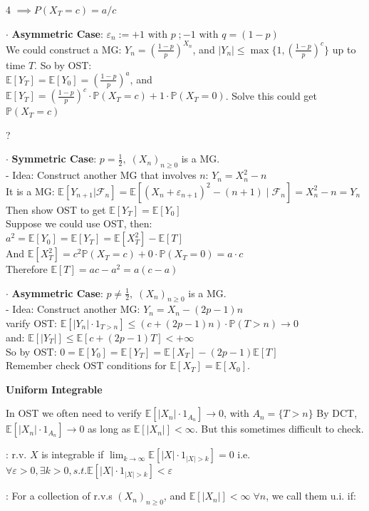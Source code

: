 \documentclass[a4paper, landscape]{article}
\newcommand{\topic}[1]{\par\medskip\textbf{#1}\par}
\newcommand{\subtopic}[1]{\par\textbf{#1}}
\renewcommand{\topic}[1]{\par\medskip\noindent\colorbox{highlightcolor}{\parbox{\dimexpr\columnwidth-2\fboxsep\relax}{\textbf{#1}}}\par}
\renewcommand{\subtopic}[1]{\par\textbf{\color{blue}{#1}}} %
\begin{document}
\begin{multicols}{4}
$\implies P(X_T=c)=a/c$
\par $\cdot$ \textbf{Asymmetric Case}: $\varepsilon_n :=+1\text{ with }p\;;-1 \text{ with }q=(1-p)$\\
We could construct a MG: $Y_n=(\frac{1-p}{p})^{X_n}$, and $|Y_n|\leqslant\max\{1,(\frac{1-p}{p})^c\}$ up to time $T$. So by OST:\\
$\mathbb E[Y_T]=\mathbb E[Y_0]=(\frac{1-p}{p})^a$, and $\mathbb E[Y_T]=(\frac{1-p}{p})^c\cdot\mathbb P(X_T=c)+1\cdot\mathbb P(X_T=0)$. Solve this could get $\mathbb P(X_T=c)$\vspace{0.5em}
\subtopic{More: what about $\mathbb E[T]$}?
\par $\cdot$ \textbf{Symmetric Case}: $p=\frac12, \;(X_n)_{n\geq0}$ is a MG.\\
- Idea: Construct another MG that involves $n$: $Y_n=X_n^2-n$\\
It is a MG: $\mathbb E[Y_{n+1}|\mathcal F_n]=\mathbb E[(X_n+\varepsilon_{n+1})^2-(n+1)\;|\;\mathcal F_n]=X_n^2-n=Y_n$ Then show OST to get $\mathbb E[Y_T]=\mathbb E[Y_0]$\\
Suppose we could use OST, then:\\
$a^2=\mathbb E[Y_0]=\mathbb E[Y_T]=\mathbb E[X_T^2]-\mathbb E[T]$\\
And $\mathbb E[X_T^2]=c^2\mathbb P(X_T=c)+0\cdot\mathbb P(X_T=0)=a\cdot c$\\
Therefore $\mathbb E[T]=ac-a^2=a(c-a)$
\par $\cdot$ \textbf{Asymmetric Case}: $p\neq\frac12, \;(X_n)_{n\geq0}$ is a MG.\\
- Idea: Construct another MG: $Y_n=X_n-(2p-1)n$\\
varify OST: $\mathbb E[|Y_n|\cdot1_{T>n}]\leqslant(c+(2p-1)n)\cdot\mathbb P(T>n)\to 0$\\
and: $\mathbb E[|Y_T|]\leqslant\mathbb E[c+(2p-1)T]<+\infty$\\
So by OST: $0=\mathbb E[Y_0]=\mathbb E[Y_T]=\mathbb E[X_T]-(2p-1)\mathbb E[T]$
$\boxed{\text{Remember check OST conditions for }\mathbb E[X_T]=\mathbb E[X_0] }.$
\topic{Uniform Integrable}
In OST we often need to verify $\mathbb E[|X_n|\cdot1_{A_n}]\to 0$, with $A_n=\{T>n\}$ By DCT, $\mathbb E[|X_n|\cdot1_{A_n}]\to 0$ as long as $\mathbb E[|X_n|]<\infty$. But this sometimes difficult to check.
\subtopic{cf: integrability}: r.v. $X$ is integrable if $\lim_{k\to\infty}\mathbb E[|X| \cdot 1_{|X|>k}]=0$ 
i.e. $\forall\varepsilon>0,\exists k>0,s.t.\mathbb E[|X| \cdot 1_{|X|>k}]<\varepsilon$
\subtopic{Uniform Integrability (u.i.)}: For a collection of r.v.s $(X_n)_{n\geqslant 0}$, and $\mathbb E[|X_n|]<\infty\;\forall n$, we call them u.i. if: \\

\end{multicols}
\end{document}
